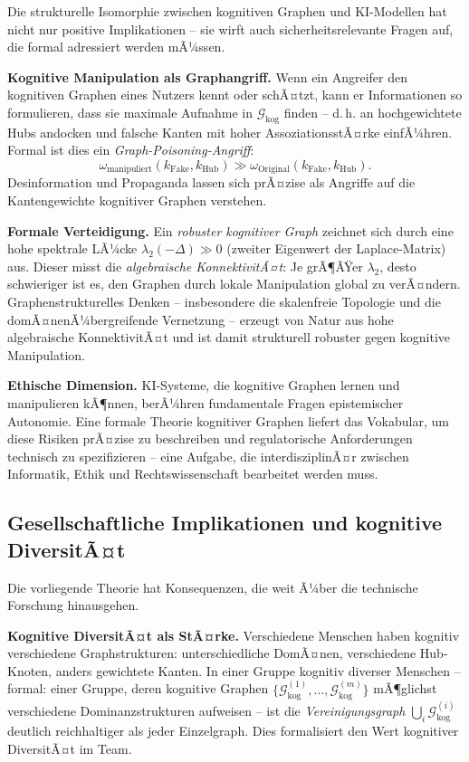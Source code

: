 ﻿\documentclass[12pt,a4paper]{article}
\theoremstyle{plain}
\theoremstyle{definition}
\theoremstyle{remark}
\newcommand{\GG}{\mathcal{G}}
\begin{document}
Die strukturelle Isomorphie zwischen kognitiven Graphen und KI-Modellen hat nicht nur positive Implikationen -- sie wirft auch sicherheitsrelevante Fragen auf, die formal adressiert werden mÃ¼ssen.

\textbf{Kognitive Manipulation als Graphangriff.} Wenn ein Angreifer den kognitiven Graphen eines Nutzers kennt oder schÃ¤tzt, kann er Informationen so formulieren, dass sie maximale Aufnahme in $\GG_{\text{kog}}$ finden -- d.\,h. an hochgewichtete Hubs andocken und falsche Kanten mit hoher AssoziationsstÃ¤rke einfÃ¼hren. Formal ist dies ein \emph{Graph-Poisoning-Angriff}:
\[
  \omega_{\text{manipuliert}}(k_{\text{Fake}}, k_{\text{Hub}}) \gg \omega_{\text{Original}}(k_{\text{Fake}}, k_{\text{Hub}}).
\]
Desinformation und Propaganda lassen sich prÃ¤zise als Angriffe auf die Kantengewichte kognitiver Graphen verstehen.

\textbf{Formale Verteidigung.} Ein \emph{robuster kognitiver Graph} zeichnet sich durch eine hohe spektrale LÃ¼cke $\lambda_2(-\Delta) \gg 0$ (zweiter Eigenwert der Laplace-Matrix) aus. Dieser misst die \emph{algebraische KonnektivitÃ¤t}: Je grÃ¶ÃŸer $\lambda_2$, desto schwieriger ist es, den Graphen durch lokale Manipulation global zu verÃ¤ndern. Graphenstrukturelles Denken -- insbesondere die skalenfreie Topologie und die domÃ¤nenÃ¼bergreifende Vernetzung -- erzeugt von Natur aus hohe algebraische KonnektivitÃ¤t und ist damit strukturell robuster gegen kognitive Manipulation.

\textbf{Ethische Dimension.} KI-Systeme, die kognitive Graphen lernen und manipulieren kÃ¶nnen, berÃ¼hren fundamentale Fragen epistemischer Autonomie. Eine formale Theorie kognitiver Graphen liefert das Vokabular, um diese Risiken prÃ¤zise zu beschreiben und regulatorische Anforderungen technisch zu spezifizieren -- eine Aufgabe, die interdisziplinÃ¤r zwischen Informatik, Ethik und Rechtswissenschaft bearbeitet werden muss.

\subsection{Gesellschaftliche Implikationen und kognitive DiversitÃ¤t}
\label{subsec:gesellschaft}

Die vorliegende Theorie hat Konsequenzen, die weit Ã¼ber die technische Forschung hinausgehen.

\textbf{Kognitive DiversitÃ¤t als StÃ¤rke.} Verschiedene Menschen haben kognitiv verschiedene Graphstrukturen: unterschiedliche DomÃ¤nen, verschiedene Hub-Knoten, anders gewichtete Kanten. In einer Gruppe kognitiv diverser Menschen -- formal: einer Gruppe, deren kognitive Graphen $\{\GG_{\text{kog}}^{(1)}, \ldots, \GG_{\text{kog}}^{(m)}\}$ mÃ¶glichst verschiedene Dominanzstrukturen aufweisen -- ist die \emph{Vereinigungsgraph} $\bigcup_i \GG_{\text{kog}}^{(i)}$ deutlich reichhaltiger als jeder Einzelgraph. Dies formalisiert den Wert kognitiver DiversitÃ¤t im Team.
\end{document}
